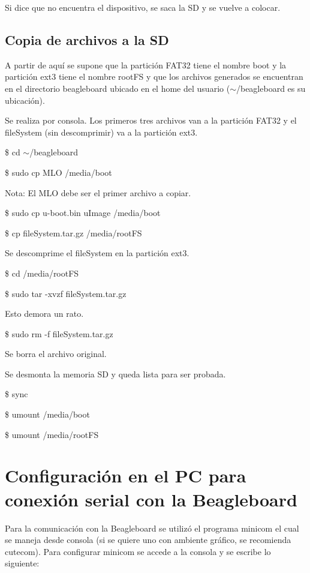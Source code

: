 \bigskip
Si dice que no encuentra el dispositivo, se saca la SD y se vuelve a colocar.


\subsection{Copia de archivos a la SD}

A partir de aquí se supone que la partición FAT32 tiene el nombre boot y la partición ext3 tiene el nombre rootFS y que los archivos generados se encuentran en el directorio beagleboard ubicado en el home del usuario ($\sim$/beagleboard es su ubicación).

\bigskip
Se realiza por consola. 
Los primeros tres archivos van a la partición FAT32 y el fileSystem (sin descomprimir) va a la 
partición ext3.

\bigskip
\centerline{\$ cd $\sim$/beagleboard}

\centerline{\$ sudo cp MLO /media/boot} 

Nota: El MLO debe ser el primer archivo a copiar.

\bigskip
\centerline{\$ sudo cp u-boot.bin uImage /media/boot}

\centerline{\$ cp fileSystem.tar.gz /media/rootFS}

\bigskip
Se descomprime el fileSystem en la partición ext3.

\bigskip
\centerline{\$ cd /media/rootFS}

\centerline{\$ sudo tar -xvzf fileSystem.tar.gz}

Esto demora un rato.

\centerline{\$ sudo rm -f fileSystem.tar.gz}

Se borra el archivo original.

\newpage
Se desmonta la memoria SD y queda lista para ser probada. 

\bigskip
\centerline{\$ sync}

\centerline{\$ umount /media/boot}

\centerline{\$ umount /media/rootFS}

\section{Configuración en el PC para conexión serial con la Beagleboard}\label{serialBb}

\bigskip
Para la comunicación con la Beagleboard se utilizó el programa minicom el cual se maneja 
desde consola (si se quiere uno con ambiente gráfico, se recomienda cutecom). 
Para configurar minicom se accede a la consola y se escribe lo siguiente: 

